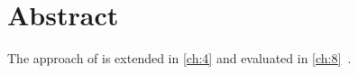 \chapter*{Abstract}
\kant[9-10]

The approach of \citet{abs-1} is extended in \cref{ch:4} and evaluated in \cref{ch:8}~\citep{abs-2,abs-3,abs-4}.

